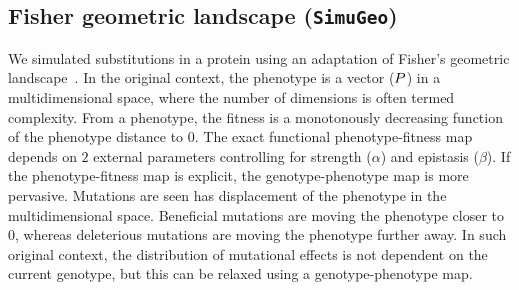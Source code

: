 \documentclass{article}
\begin{document}
	\begin{table}[H]
		\centering
		\noindent{}
		\caption[Inferred amino-acid entropy for \texttt{SimuPoly}]{
		Estimated amino-acid entropy under simulation accounting for finite population effects, site linkage and short term fluctuation of $\Ne$.
		Estimation is obtained with the mechanistic inference model developed in this paper of site-specific amino-acid fitness profiles and log-Brownian process for $\Ne$, $\mu$ and life-history traits (in the left column), or under the assumption of constant $\Ne$ (in the right column).}
	\end{table}

	\subsection{Fisher geometric landscape (\texttt{SimuGeo})}
	\label{subsec:fisher-geometric-landscape}

	We simulated substitutions in a protein using an adaptation of Fisher's geometric landscape~\citep{Tenaillon2014,Blanquart2016}.
	In the original context, the {phenotype} is a vector ($P$) in a multidimensional space, where the number of dimensions is often termed complexity.
	From a {phenotype}, the fitness is a monotonously decreasing function of the {phenotype} distance to $0$.
	The exact functional phenotype-fitness map depends on $2$ external parameters controlling for strength ($\alpha$) and epistasis ($\beta$).
	If the phenotype-fitness map is explicit, the genotype-phenotype map is more pervasive.
	Mutations are seen has displacement of the {phenotype} in the multidimensional space.
	Beneficial mutations are moving the {phenotype} closer to $0$, whereas deleterious mutations are moving the {phenotype} further away.
	In such original context, the distribution of mutational effects is not dependent on the current genotype, but this can be relaxed using a genotype-phenotype map.\\
\end{document}
